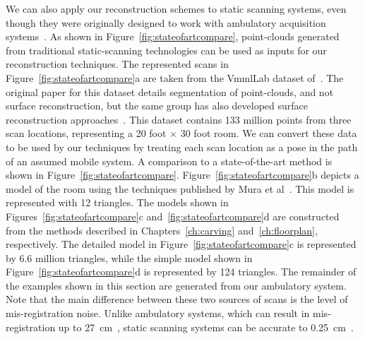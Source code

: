 \documentclass[12pt,onecolumn,oneside]{book}
\begin{document}
We can also apply our reconstruction schemes to static scanning systems, even though they were originally designed to work with ambulatory acquisition systems~\cite{Backpack}.  As shown in Figure~\ref{fig:stateofartcompare}, point-clouds generated from traditional static-scanning technologies can be used as inputs for our reconstruction techniques. The represented scans in Figure~\ref{fig:stateofartcompare}a are taken from the VmmlLab dataset of~\cite{Mattausch14}.  The original paper for this dataset details segmentation of point-clouds, and not surface reconstruction, but the same group has also developed surface reconstruction approaches~\cite{Mura13,Mura14}. This dataset contains 133 million points from three scan locations, representing a 20 foot $\times$ 30 foot room.  We can convert these data to be used by our techniques by treating each scan location as a pose in the path of an assumed mobile system.  A comparison to a state-of-the-art method is shown in Figure~\ref{fig:stateofartcompare}.  Figure~\ref{fig:stateofartcompare}b depicts a model of the room using the techniques published by Mura et al~\cite{Mura13}.  This model is represented with 12 triangles.  The models shown in Figures~\ref{fig:stateofartcompare}c and~\ref{fig:stateofartcompare}d are constructed from the methods described in Chapters~\ref{ch:carving} and~\ref{ch:floorplan}, respectively.  The detailed model in Figure~\ref{fig:stateofartcompare}c is represented by 6.6 million triangles, while the simple model shown in Figure~\ref{fig:stateofartcompare}d is represented by 124 triangles.  The remainder of the examples shown in this section are generated from our ambulatory system.  Note that the main difference between these two sources of scans is the level of mis-registration noise. Unlike ambulatory systems, which can result in mis-registration up to 27~cm~\cite{NickJournal}, static scanning systems can be accurate to 0.25~cm~\cite{Mura13}.
\end{document}
